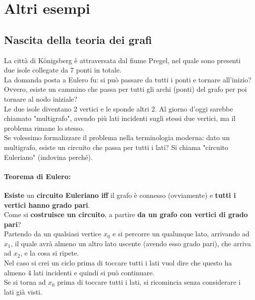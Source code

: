 
\section{Altri esempi}

\subsection*{Nascita della teoria dei grafi}

La città di K\"onigsberg è attraversata dal fiume Pregel, nel quale sono presenti due isole collegate da 7 ponti in totale.\\

La domanda posta a Eulero fu: si può passare da tutti i ponti e tornare all'inizio? Ovvero, esiste un cammino che passa per tutti gli archi (ponti) del grafo per poi tornare al nodo iniziale?\\

Le due isole diventano 2 vertici e le sponde altri 2. Al giorno d'oggi sarebbe chiamato "multigrafo", avendo più lati incidenti sugli stessi due vertici, ma il problema rimane lo stesso.\\

Se volessimo formalizzare il problema nella terminologia moderna: dato un multigrafo, esiste un circuito che passa per tutti i lati? Si chiama "circuito Euleriano" (indovina perché).\\

\paragraph{Teorema di Eulero:} \textbf{Esiste} un \textbf{circuito Euleriano iff} il grafo è connesso (ovviamente) e \textbf{tutti i vertici hanno grado pari}.\\

Come si \textbf{costruisce un circuito}, a partire \textbf{da un grafo con vertici di grado pari}? \\
Partendo da un qualsiasi vertice $x_0$ e si percorre un qualunque lato, arrivando ad $x_1$, il quale avrà almeno un altro lato uscente (avendo esso grado pari), che arriva ad $x_2$, e la cosa si ripete.\\
Nel caso si crei un ciclo prima di toccare tutti i lati vuol dire che questo ha almeno 4 lati incidenti e quindi si può continuare.\\
Se si torna ad $x_0$ prima di toccare tutti i lati, si ricomincia senza considerare i lati già visti.\\

